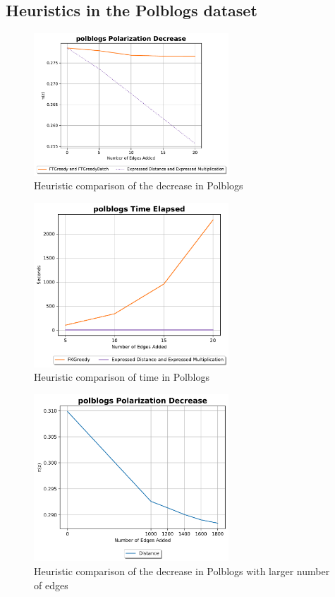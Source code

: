 \begin{table}[H]
\subsection{Heuristics in the Polblogs dataset}

\begin{figure}[H]
	\centering
	\includegraphics[width=0.65\textwidth]{Figures/polblogs Polarization Decrease}
	\caption{Heuristic comparison of the decrease in Polblogs}
	\label{fig:polblogs_pol}
\end{figure}


\begin{figure}[H]
	\centering
	\includegraphics[width=0.65\textwidth]{Figures/polblogs Time Elapsed}
	\caption{Heuristic comparison of time in Polblogs}
	\label{fig:polblogs_time}
\end{figure}

\clearpage

\begin{figure}[H]
	\centering
	\includegraphics[width=0.65\textwidth]{Figures/polblogs Polarization Decrease 2}
	\caption{Heuristic comparison of the decrease in Polblogs with larger number of edges}
	\label{fig:polblogs2_pol}
\end{figure}



\end{table}
